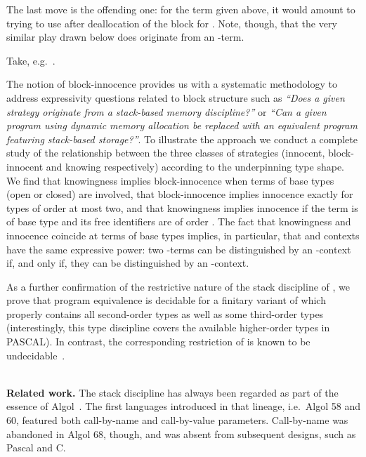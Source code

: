 \documentclass{CSML}
\theoremstyle{definition}\newtheorem{definition}[thm]{Definition}
\theoremstyle{definition}\newtheorem{example}[thm]{Example}
\theoremstyle{definition}\newtheorem{proposition}[thm]{Proposition}
\theoremstyle{definition}\newtheorem{lemma}[thm]{Lemma}
\theoremstyle{definition}\newtheorem{theorem}[thm]{Theorem}
\theoremstyle{definition}\newtheorem{corollary}[thm]{Corollary}
\theoremstyle{definition}\newtheorem{remark}[thm]{Remark}
\newcommand\nt[1]{#1}
\newcommand{\nada}{}
\begin{document}
The last move is the offending one: for the term given above, it would amount to trying to use  after deallocation of the block for .
Note, though, that the very similar play drawn below does originate from an -term. 


Take, e.g.\
.

The notion of block-innocence provides us with a systematic methodology
to address expressivity questions  related to block structure such as
\emph{``Does a given strategy originate from a stack-based memory discipline?''}
or \emph{``Can a given program using dynamic memory allocation be replaced
with an equivalent program featuring stack-based storage?''}.
To illustrate the approach we conduct a complete study of the relationship
between the three classes of strategies (innocent, block-innocent and knowing respectively) 
according to the underpinning type shape.
We find that knowingness implies block-innocence when terms of base types
(open or closed) are involved, that block-innocence implies innocence
exactly for types of order at most two, and that knowingness implies
innocence if the term is of base type and its free identifiers are of order .
\nt{The fact that knowingness and innocence coincide at terms of base types implies, in particular, that  and  contexts have the same expressive power: two -terms can be distinguished by an -context if, and only if, they can be distinguished by an -context.}

As a further confirmation of the restrictive nature of the stack discipline of ,
we prove that program equivalence is decidable for a finitary variant of 
which properly contains all second-order types as well as some third-order types
(interestingly, this type discipline covers the available higher-order types in PASCAL).
In contrast, the corresponding restriction of  is known to be undecidable~\cite{Mur04b}.

\nada\\
\noindent
{\bf Related work.} The stack discipline has always been regarded as part of the essence
of Algol~\cite{Rey81}. \nt{The first languages introduced in that lineage, i.e.\ Algol 58 and 60, 
featured both call-by-name and call-by-value parameters. Call-by-name was abandoned in Algol 68, 
though, and was absent from subsequent designs, such as Pascal and C.
}
\end{document}
